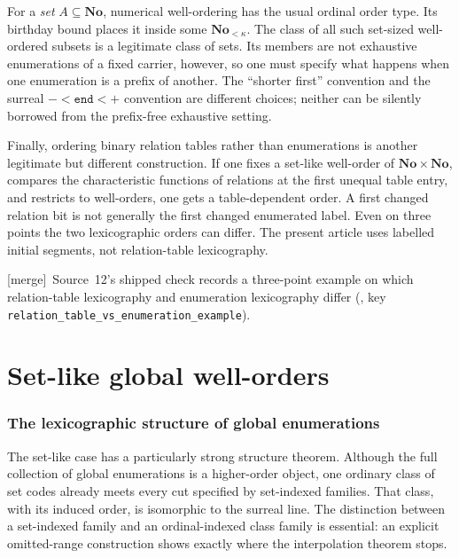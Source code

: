 \documentclass[11pt]{article}
\theoremstyle{definition}
\theoremstyle{remark}
\newcommand{\No}{\mathbf{No}}
\newcommand{\End}{\mathtt{end}}
\newcommand{\code}[1]{\texttt{\small #1}}
\newcommand{\merge}{\textsf{[merge]}}
\begin{document}
For a \emph{set} $A\subseteq\No$, numerical well-ordering has the usual
ordinal order type. Its birthday bound places it inside some $\No_{<\kappa}$.
The class of all such set-sized well-ordered subsets is a legitimate
class of sets. Its members are not exhaustive enumerations of a fixed
carrier, however, so one must specify what happens when one enumeration
is a prefix of another. The ``shorter first'' convention and the surreal
$-<\End<+$ convention are different choices; neither can be silently
borrowed from the prefix-free exhaustive setting.

Finally, ordering binary relation tables rather than enumerations is
another legitimate but different construction. If one fixes a set-like
well-order of $\No\times\No$, compares the characteristic functions of
relations at the first unequal table entry, and restricts to well-orders,
one gets a table-dependent order. A first changed relation bit is not
generally the first changed enumerated label. Even on three points the
two lexicographic orders can differ. The present article uses labelled
initial segments, not relation-table lexicography.


\merge\ Source~12's shipped check records a three-point example on which
relation-table lexicography and enumeration lexicography differ
(, key
\code{relation\_table\_vs\_enumeration\_example}).

\part{Set-like global well-orders}\label{swo:part:setlike}

\section{The lexicographic structure of global enumerations}
\label{swo:gl:section}

The set-like case has a particularly strong structure theorem.  Although the
full collection of global enumerations is a higher-order object, one ordinary
class of set codes already meets every cut specified by set-indexed families.
That class, with its induced order, is isomorphic to the surreal line.  The
distinction between a set-indexed family and an ordinal-indexed class family is
essential: an explicit omitted-range construction shows exactly where the
interpolation theorem stops.
\end{document}
